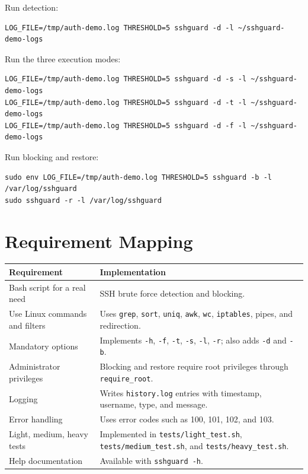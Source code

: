 \documentclass[12pt,a4paper]{article}
\begin{document}
Run detection:

\begin{lstlisting}[style=bashstyle]
LOG_FILE=/tmp/auth-demo.log THRESHOLD=5 sshguard -d -l ~/sshguard-demo-logs
\end{lstlisting}

Run the three execution modes:

\begin{lstlisting}[style=bashstyle]
LOG_FILE=/tmp/auth-demo.log THRESHOLD=5 sshguard -d -s -l ~/sshguard-demo-logs
LOG_FILE=/tmp/auth-demo.log THRESHOLD=5 sshguard -d -t -l ~/sshguard-demo-logs
LOG_FILE=/tmp/auth-demo.log THRESHOLD=5 sshguard -d -f -l ~/sshguard-demo-logs
\end{lstlisting}

Run blocking and restore:

\begin{lstlisting}[style=bashstyle]
sudo env LOG_FILE=/tmp/auth-demo.log THRESHOLD=5 sshguard -b -l /var/log/sshguard
sudo sshguard -r -l /var/log/sshguard
\end{lstlisting}

\section{Requirement Mapping}

\begin{longtable}{|p{6cm}|p{8cm}|}
\hline
\textbf{Requirement} & \textbf{Implementation} \\
\hline
Bash script for a real need & SSH brute force detection and blocking. \\
\hline
Use Linux commands and filters & Uses \texttt{grep}, \texttt{sort}, \texttt{uniq}, \texttt{awk}, \texttt{wc}, \texttt{iptables}, pipes, and redirection. \\
\hline
Mandatory options & Implements \texttt{-h}, \texttt{-f}, \texttt{-t}, \texttt{-s}, \texttt{-l}, \texttt{-r}; also adds \texttt{-d} and \texttt{-b}. \\
\hline
Administrator privileges & Blocking and restore require root privileges through \texttt{require\_root}. \\
\hline
Logging & Writes \texttt{history.log} entries with timestamp, username, type, and message. \\
\hline
Error handling & Uses error codes such as 100, 101, 102, and 103. \\
\hline
Light, medium, heavy tests & Implemented in \texttt{tests/light\_test.sh}, \texttt{tests/medium\_test.sh}, and \texttt{tests/heavy\_test.sh}. \\
\hline
Help documentation & Available with \texttt{sshguard -h}. \\
\hline
\end{longtable}
\end{document}
